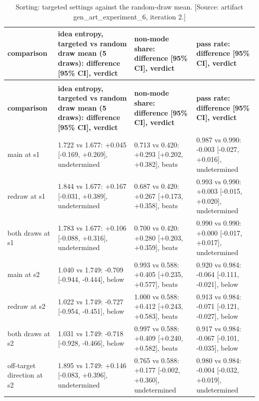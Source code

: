 \documentclass[11pt,letterpaper]{article}
\begin{document}
\endgroup
\begingroup\small
\setlength{\tabcolsep}{4.0pt}
\begin{longtable}{@{}>{\raggedright\arraybackslash\hspace{0pt}}p{74.23pt}>{\raggedright\arraybackslash\hspace{0pt}}p{125.79pt}>{\raggedright\arraybackslash\hspace{0pt}}p{117.77pt}>{\raggedright\arraybackslash\hspace{0pt}}p{119.96pt}@{}}
\caption{Sorting: targeted settings against the random-draw mean. [Source: artifact gen\_art\_experiment\_6, iteration 2.]}\label{tab:73}\\
\toprule
\textbf{comparison} & \textbf{idea entropy, targeted vs random draw mean (5 draws): difference [95\% CI], verdict} & \textbf{non-mode share: difference [95\% CI], verdict} & \textbf{pass rate: difference [95\% CI], verdict} \\
\midrule
\endfirsthead
\multicolumn{4}{@{}l}{\emph{(continued)}}\\
\toprule
\textbf{comparison} & \textbf{idea entropy, targeted vs random draw mean (5 draws): difference [95\% CI], verdict} & \textbf{non-mode share: difference [95\% CI], verdict} & \textbf{pass rate: difference [95\% CI], verdict} \\
\midrule
\endhead
\bottomrule
\endlastfoot
main at s1 & 1.722 vs 1.677: +0.045 [-0.169, +0.269], undetermined & 0.713 vs 0.420: +0.293 [+0.202, +0.382], beats & 0.987 vs 0.990: -0.003 [-0.027, +0.016], undetermined \\
redraw at s1 & 1.844 vs 1.677: +0.167 [-0.031, +0.389], undetermined & 0.687 vs 0.420: +0.267 [+0.173, +0.358], beats & 0.993 vs 0.990: +0.003 [-0.015, +0.020], undetermined \\
both draws at s1 & 1.783 vs 1.677: +0.106 [-0.088, +0.316], undetermined & 0.700 vs 0.420: +0.280 [+0.203, +0.359], beats & 0.990 vs 0.990: +0.000 [-0.017, +0.017], undetermined \\
main at s2 & 1.040 vs 1.749: -0.709 [-0.944, -0.444], below & 0.993 vs 0.588: +0.405 [+0.235, +0.577], beats & 0.920 vs 0.984: -0.064 [-0.111, -0.021], below \\
redraw at s2 & 1.022 vs 1.749: -0.727 [-0.954, -0.451], below & 1.000 vs 0.588: +0.412 [+0.243, +0.583], beats & 0.913 vs 0.984: -0.071 [-0.121, -0.027], below \\
both draws at s2 & 1.031 vs 1.749: -0.718 [-0.928, -0.466], below & 0.997 vs 0.588: +0.409 [+0.240, +0.582], beats & 0.917 vs 0.984: -0.067 [-0.101, -0.035], below \\
off-target direction at s2 & 1.895 vs 1.749: +0.146 [-0.083, +0.396], undetermined & 0.765 vs 0.588: +0.177 [-0.002, +0.360], undetermined & 0.980 vs 0.984: -0.004 [-0.032, +0.019], undetermined \\
\end{longtable}
\end{document}
